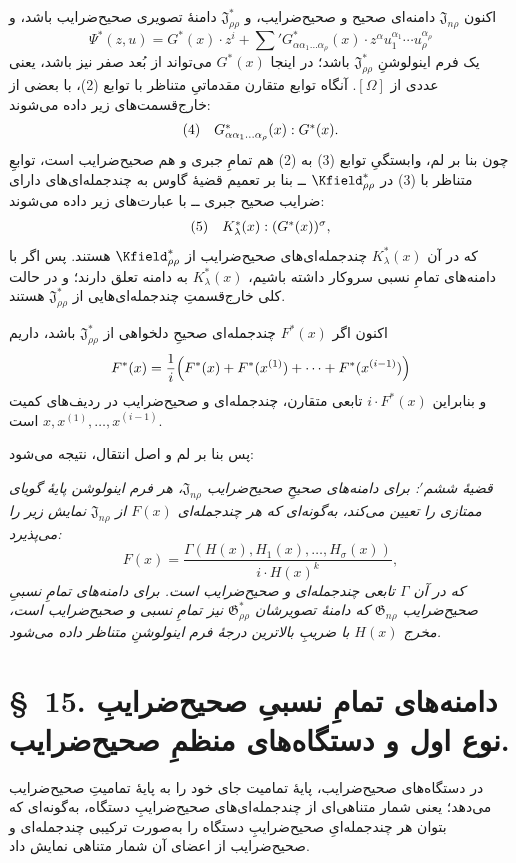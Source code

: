 \documentclass[11pt]{article}
\providecommand{\Jdom}{\mathfrak{J}}
\providecommand{\Gdom}{\mathfrak{G}}
\begin{document}
اکنون $\Jdom_{n\rho}$ دامنه‌ای صحیح و صحیح‌ضرایب، و $\Jdom^*_{\rho\rho}$ دامنهٔ تصویری صحیح‌ضرایب باشد، و
\[
  \Psi^*(z,u)=G^*(x)\cdot z^i+
  \sum{}'G^*_{\alpha\alpha_1\ldots\alpha_\rho}(x)\cdot
  z^\alpha u_1^{\alpha_1}\cdots u_\rho^{\alpha_\rho}
\]
یک فرم اینولوشنِ $\Jdom^*_{\rho\rho}$ باشد؛ در اینجا $G^*(x)$ می‌تواند از بُعد صفر نیز باشد، یعنی عددی از $[\Omega]$. آنگاه توابع متقارن مقدماتیِ متناظر با توابع (2)، با بعضی از خارج‌قسمت‌های زیر داده می‌شوند:
\[
\begin{array}{@{}l@{\quad}c@{}}
(4)&
  G^*_{\alpha\alpha_1\ldots\alpha_\rho}(x):G^*(x).
\end{array}
\]
چون بنا بر لم، وابستگیِ توابع (3) به (2) هم تمامِ جبری و هم صحیح‌ضرایب است، توابعِ متناظر با (3) در $\Kfield^*_{\rho\rho}$ ــ بنا بر تعمیم قضیهٔ گاوس به چندجمله‌ای‌های دارای ضرایب صحیح جبری ــ با عبارت‌های زیر داده می‌شوند:
\[
\begin{array}{@{}l@{\quad}c@{}}
(5)&
  K_\lambda^*(x):(G^*(x))^\sigma,
\end{array}
\]
که در آن $K_\lambda^*(x)$ چندجمله‌ای‌های صحیح‌ضرایب از $\Kfield^*_{\rho\rho}$ هستند. پس اگر با دامنه‌های تمامِ نسبی سروکار داشته باشیم، $K_\lambda^*(x)$ به دامنه تعلق دارند؛ و در حالت کلی خارج‌قسمتِ چندجمله‌ای‌هایی از $\Jdom^*_{\rho\rho}$ هستند.

اکنون اگر $F^*(x)$ چندجمله‌ای صحیحِ دلخواهی از $\Jdom^*_{\rho\rho}$ باشد، داریم
\[
  F^*(x)=\frac1i\Bigl(F^*(x)+F^*(x^{(1)})+\cdots+F^*(x^{(i-1)})\Bigr)
\]
و بنابراین $i\cdot F^*(x)$ تابعی متقارن، چندجمله‌ای و صحیح‌ضرایب در ردیف‌های کمیت $x,x^{(1)},\ldots,x^{(i-1)}$ است.

پس بنا بر لم و اصل انتقال، نتیجه می‌شود:

\emph{قضیهٔ ششم$'$: برای دامنه‌های صحیحِ صحیح‌ضرایب $\Jdom_{n\rho}$، هر فرم اینولوشن پایهٔ گویای ممتازی را تعیین می‌کند، به‌گونه‌ای که هر چندجمله‌ای $F(x)$ از $\Jdom_{n\rho}$ نمایش زیر را می‌پذیرد:}
\[
  F(x)=\frac{\Gamma(H(x),H_1(x),\ldots,H_\sigma(x))}{i\cdot H(x)^k},
\]
\emph{که در آن $\Gamma$ تابعی چندجمله‌ای و صحیح‌ضرایب است. برای دامنه‌های تمامِ نسبیِ صحیح‌ضرایب $\Gdom_{n\rho}$ که دامنهٔ تصویرشان $\Gdom^*_{\rho\rho}$ نیز تمامِ نسبی و صحیح‌ضرایب است، مخرج $H(x)$ با ضریبِ بالاترین درجهٔ فرم اینولوشنِ متناظر داده می‌شود.}

\section*{\S\ 15. دامنه‌های تمامِ نسبیِ صحیح‌ضرایبِ نوع اول و دستگاه‌های منظمِ صحیح‌ضرایب.}

در دستگاه‌های صحیح‌ضرایب، پایهٔ تمامیت جای خود را به پایهٔ تمامیتِ صحیح‌ضرایب می‌دهد؛ یعنی شمار متناهی‌ای از چندجمله‌ای‌های صحیح‌ضرایبِ دستگاه، به‌گونه‌ای که بتوان هر چندجمله‌ایِ صحیح‌ضرایبِ دستگاه را به‌صورت ترکیبی چندجمله‌ای و صحیح‌ضرایب از اعضای آن شمار متناهی نمایش داد.
\end{document}

